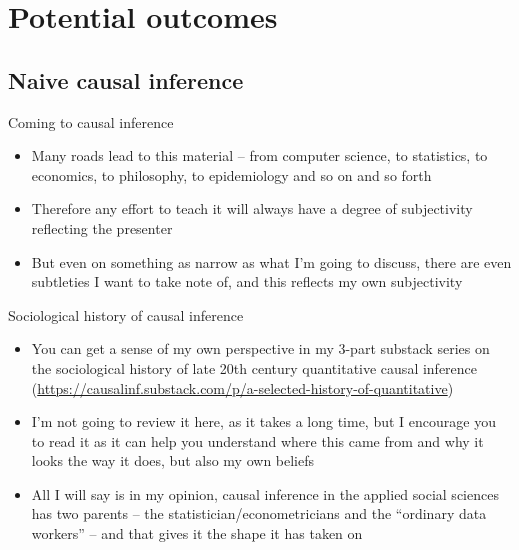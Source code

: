 \documentclass{beamer}
\begin{document}
\section{Potential outcomes}



\subsection{Naive causal inference}


\begin{frame}{Coming to causal inference}

\begin{itemize}
\item Many roads lead to this material -- from computer science, to statistics, to economics, to philosophy, to epidemiology and so on and so forth
\item Therefore any effort to teach it will always have a degree of subjectivity reflecting the presenter
\item But even on something as narrow as what I'm going to discuss, there are even subtleties I want to take note of, and this reflects my own subjectivity

\end{itemize}

\end{frame}


\begin{frame}{Sociological history of causal inference}

\begin{itemize}

\item You can get a sense of my own perspective in my 3-part substack series on the sociological history of late 20th century quantitative causal inference (\url{https://causalinf.substack.com/p/a-selected-history-of-quantitative})
\item I'm not going to review it here, as it takes a long time, but I encourage you to read it as it can help you understand where this came from and why it looks the way it does, but also my own beliefs
\item All I will say is in my opinion, causal inference in the applied social sciences has two parents -- the statistician/econometricians and the ``ordinary data workers'' -- and that gives it the shape it has taken on
\end{itemize}

\end{frame}
\end{document}
